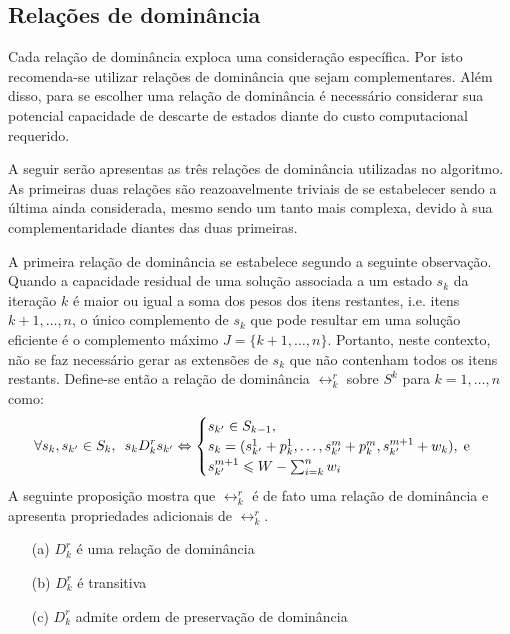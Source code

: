 
\subsection{Relações de dominância}

Cada relação de dominância exploca uma consideração específica.
Por isto recomenda-se utilizar relações de dominância que sejam complementares.
Além disso, para se escolher uma relação de dominância é necessário considerar
sua potencial capacidade de descarte de estados diante do
custo computacional requerido.

A seguir serão apresentas as três relações de dominância utilizadas no algoritmo.
As primeiras duas relações são reazoavelmente triviais de se estabelecer sendo
a última ainda considerada, mesmo sendo um tanto mais complexa, devido à sua
complementaridade diantes das duas primeiras.

A primeira relação de dominância se estabelece segundo a seguinte observação.
Quando a capacidade residual de uma solução associada a um estado $s_k$
da iteração $k$ é maior ou igual a soma dos pesos dos itens restantes,
i.e. itens $k+1, \ldots, n$, o único complemento de $s_k$ que pode resultar
em uma solução eficiente é o complemento máximo $J = \{k+1, \ldots, n\}$.
Portanto, neste contexto, não se faz necessário gerar as extensões de $s_k$
que não contenham todos os itens restants.
Define-se então a relação de dominância $\rel_k^r$ sobre $S^k$ para
$k = 1, \ldots, n$ como:
\begin{displaymath}
  \forall s_k, s_{{k'}} \in S_k, \enskip
  s_k D_k^r s_{{k'}}
    \Leftrightarrow
    \begin{cases}
      s_{{k'}} \in S_{k-1}, \\
      s_k = (s_{{k'}}^1 + p_k^1, \ldots, s_{{k'}}^m + p_k^m, s_{{k'}}^{m+1} + w_k), \; \text{e} \\
      s_{{k'}}^{m+1} \leqslant W - \sum_{i=k}^n w_i
    \end{cases}
\end{displaymath}
A seguinte proposição mostra que $\rel_k^r$ é de fato uma relação de dominância
e apresenta propriedades adicionais de $\rel_k^r$.

\begin{myprop}[Relação $D_k^r$]
  \noindent
  \begin{enumerate}
    \item[(a)] $D_k^r$ é uma relação de dominância
    \item[(b)] $D_k^r$ é transitiva
    \item[(c)] $D_k^r$ admite ordem de preservação de dominância
\end{enumerate}
\end{myprop}

